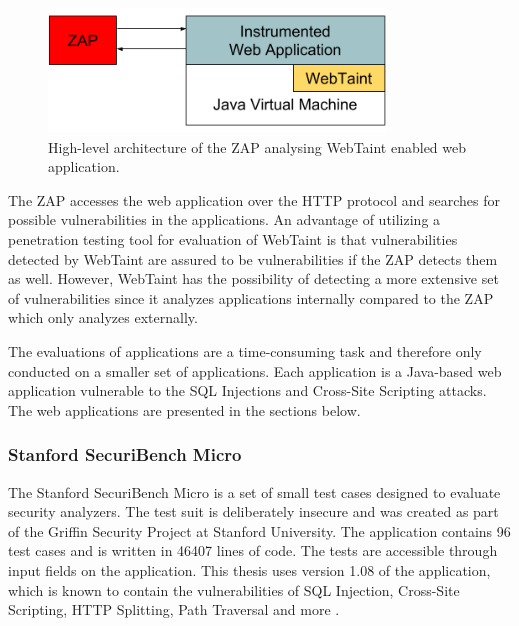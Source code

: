 \begin{figure}[H]
    \centering
    \includegraphics[width=0.8\textwidth]{images/ZAPArchitecture.png}
    \caption{High-level architecture of the ZAP analysing WebTaint enabled web application.}
    \label{fig:ZAP}
\end{figure}

The ZAP accesses the web application over the HTTP protocol and searches for possible vulnerabilities in the applications. An advantage of utilizing a penetration testing tool for evaluation of WebTaint is that vulnerabilities detected by WebTaint are assured to be vulnerabilities if the ZAP detects them as well. However, WebTaint has the possibility of detecting a more extensive set of vulnerabilities since it analyzes applications internally compared to the ZAP which only analyzes externally.

The evaluations of applications are a time-consuming task and therefore only conducted on a smaller set of applications. Each application is a Java-based web application vulnerable to the SQL Injections and Cross-Site Scripting attacks. The web applications are presented in the sections below.



\subsubsection{Stanford SecuriBench Micro}
The Stanford SecuriBench Micro is a set of small test cases designed to evaluate security analyzers. The test suit is deliberately insecure and was created as part of the Griffin Security Project \parencite{griffin} at Stanford University. The application contains 96 test cases and is written in 46407 lines of code. The tests are accessible through input fields on the application. This thesis uses version 1.08 of the application, which is known to contain the vulnerabilities of SQL Injection, Cross-Site Scripting, HTTP Splitting, Path Traversal and more \parencite{securiBenchMicro, microfaq}. 



